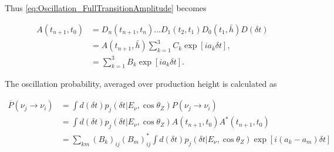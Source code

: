 Thus \autoref{eq:Oscillation_FullTransitionAmplitude} becomes

\begin{equation}
  \begin{split}
    A(t_{n+1},t_{0}) &= D_{n}(t_{n+1},t_{n})...D_{1}(t_{2},t_{1})D_{0}(t_{1},\bar{h})D(\delta t) \\
    &= A(t_{n+1},\bar{h}) \sum_{k=1}^{3} C_{k} \exp[ia_{k} \delta t], \\
    &= \sum_{k=1}^{3} B_{k} \exp[ia_{k} \delta t].
  \end{split}
\end{equation}

The oscillation probability, averaged over production height is calculated as

\begin{equation}
  \begin{split}
    \overline P(\nu_{j} \rightarrow \nu_{i}) &= \int d(\delta t) p_{j}(\delta t|E_{\nu}, \cos\theta_{Z}) P(\nu_{j} \rightarrow \nu_{i}) \\
    &= \int d(\delta t) p_{j}(\delta t|E_{\nu}, \cos\theta_{Z})	A(t_{n+1},t_{0}) A^{*}(t_{n+1},t_{0}) \\
    &= \sum_{km} (B_{k})_{ij} (B_{m})^{*}_{ij} \int d(\delta t) p_{j}(\delta t|E_{\nu}, \cos\theta_{Z}) \exp[i(a_{k}-a_{m})\delta t]
  \end{split}
\end{equation}

